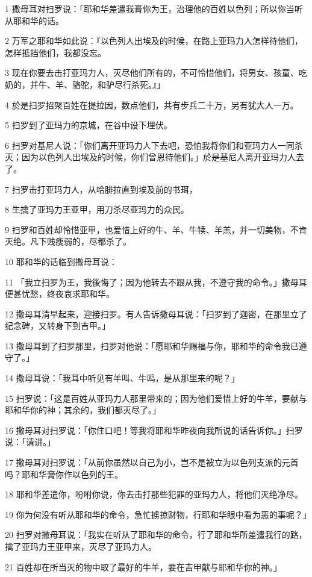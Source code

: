 \par 1 撒母耳对扫罗说：「耶和华差遣我膏你为王，治理他的百姓以色列；所以你当听从耶和华的话。
\par 2 万军之耶和华如此说：『以色列人出埃及的时候，在路上亚玛力人怎样待他们，怎样抵挡他们，我都没忘。
\par 3 现在你要去击打亚玛力人，灭尽他们所有的，不可怜惜他们，将男女、孩童、吃奶的，并牛、羊、骆驼，和驴尽行杀死。』」
\par 4 於是扫罗招聚百姓在提拉因，数点他们，共有步兵二十万，另有犹大人一万。
\par 5 扫罗到了亚玛力的京城，在谷中设下埋伏。
\par 6 扫罗对基尼人说：「你们离开亚玛力人下去吧，恐怕我将你们和亚玛力人一同杀灭；因为以色列人出埃及的时候，你们曾恩待他们。」於是基尼人离开亚玛力人去了。
\par 7 扫罗击打亚玛力人，从哈腓拉直到埃及前的书珥，
\par 8 生擒了亚玛力王亚甲，用刀杀尽亚玛力的众民。
\par 9 扫罗和百姓却怜惜亚甲，也爱惜上好的牛、羊、牛犊、羊羔，并一切美物，不肯灭绝。凡下贱瘦弱的，尽都杀了。
\par 10 耶和华的话临到撒母耳说：
\par 11 「我立扫罗为王，我後悔了；因为他转去不跟从我，不遵守我的命令。」撒母耳便甚忧愁，终夜哀求耶和华。
\par 12 撒母耳清早起来，迎接扫罗。有人告诉撒母耳说：「扫罗到了迦密，在那里立了纪念碑，又转身下到吉甲。」
\par 13 撒母耳到了扫罗那里，扫罗对他说：「愿耶和华赐福与你，耶和华的命令我已遵守了。」
\par 14 撒母耳说：「我耳中听见有羊叫、牛鸣，是从那里来的呢？」
\par 15 扫罗说：「这是百姓从亚玛力人那里带来的；因为他们爱惜上好的牛羊，要献与耶和华你的神；其余的，我们都灭尽了。」
\par 16 撒母耳对扫罗说：「你住口吧！等我将耶和华昨夜向我所说的话告诉你。」扫罗说：「请讲。」
\par 17 撒母耳对扫罗说：「从前你虽然以自己为小，岂不是被立为以色列支派的元首吗？耶和华膏你作以色列的王。
\par 18 耶和华差遣你，吩咐你说，你去击打那些犯罪的亚玛力人，将他们灭绝净尽。
\par 19 你为何没有听从耶和华的命令，急忙掳掠财物，行耶和华眼中看为恶的事呢？」
\par 20 扫罗对撒母耳说：「我实在听从了耶和华的命令，行了耶和华所差遣我行的路，擒了亚玛力王亚甲来，灭尽了亚玛力人。
\par 21 百姓却在所当灭的物中取了最好的牛羊，要在吉甲献与耶和华你的神。」
